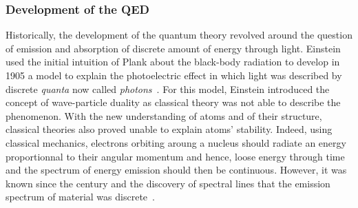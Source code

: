 	\subsubsection*{Development of the \acl{QED}}
	\label{chapt2:sssec:QED}
	
	Historically, the development of the quantum theory revolved around the question of emission and absorption of discrete amount of energy through light. Einstein used the initial intuition of Plank about the black-body radiation to develop in 1905 a model to explain the photoelectric effect in which light was described by discrete \textit{quanta} now called \textit{photons}~\cite{PLANK1900,EINSTEIN1905PHOTO}. For this model, Einstein introduced the concept of wave-particle duality as classical theory was not able to describe the phenomenon. With the new understanding of atoms and of their structure, classical theories also proved unable to explain atoms' stability. Indeed, using classical mechanics, electrons orbiting aroung a nucleus should radiate an energy proportionnal to their angular momentum and hence, loose energy through time and the spectrum of energy emission should then be continuous. However, it was known since the  century and the discovery of spectral lines that the emission spectrum of material was discrete~\cite{FRAUNHOFER1814}.
	
